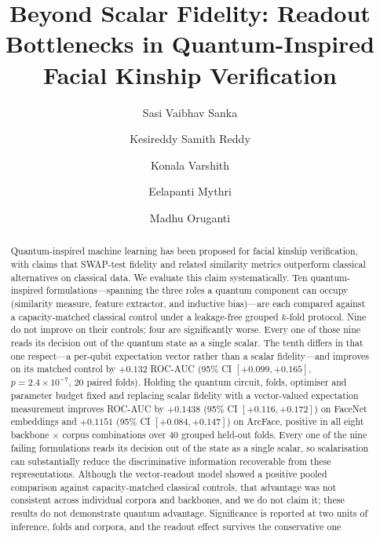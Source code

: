 \documentclass[preprint,12pt]{elsarticle}
\begin{document}
\begin{frontmatter}

\title{Beyond Scalar Fidelity: Readout Bottlenecks in Quantum-Inspired
Facial Kinship Verification}

\author[1]{Sasi Vaibhav Sanka}
\author[1]{Kesireddy Samith Reddy}
\author[1]{Konala Varshith}
\author[1]{Eelapanti Mythri}
\author[1]{Madhu Oruganti}

\address[1]{Department of Artificial Intelligence and Data Science, Koneru Lakshmaiah Education Foundation, Hyderabad-500075, India}

\begin{abstract}
Quantum-inspired machine learning has been proposed for facial kinship
verification, with claims that SWAP-test fidelity and related similarity
metrics outperform classical alternatives on classical data. We evaluate this
claim systematically. Ten quantum-inspired formulations---spanning the three
roles a quantum component can occupy (similarity measure, feature extractor,
and inductive bias)---are each compared against a capacity-matched classical
control under a leakage-free grouped $k$-fold protocol. Nine do not improve on
their controls; four are significantly worse. Every one of those nine reads its
decision out of the quantum state as a single scalar. The tenth differs in that
one respect---a per-qubit expectation vector rather than a scalar
fidelity---and improves on its matched control by $+0.132$ ROC-AUC
(95\% CI $[+0.099, +0.165]$, $p = 2.4 \times 10^{-7}$, 20 paired folds).
Holding the quantum circuit, folds, optimiser and parameter budget fixed and
replacing scalar fidelity with a vector-valued expectation measurement improves
ROC-AUC by $+0.1438$ (95\% CI $[+0.116,+0.172]$) on FaceNet embeddings and
$+0.1151$ (95\% CI $[+0.084,+0.147]$) on ArcFace, positive in all eight
backbone $\times$ corpus combinations over $40$ grouped held-out folds. Every
one of the nine failing formulations reads its decision out of the state as a
single scalar, so scalarisation can substantially reduce the discriminative
information recoverable from these representations. Although the vector-readout
model showed a positive pooled comparison against capacity-matched classical
controls, that advantage was not consistent across individual corpora and
backbones, and we do not claim it; these results do not demonstrate quantum
advantage. Significance is reported at two units of inference, folds and
corpora, and the readout effect survives the conservative one

\end{abstract}
\end{frontmatter}
\end{document}
